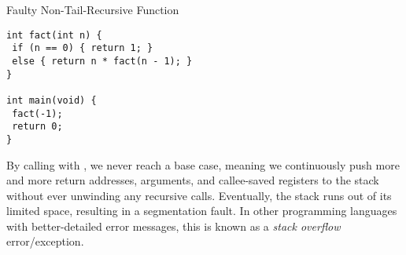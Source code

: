 \begin{cl}[main.c]{Faulty Non-Tail-Recursive Function}
\begin{lstlisting}[language=MyC]
int fact(int n) {
 if (n == 0) { return 1; }
 else { return n * fact(n - 1); }
}

int main(void) {
 fact(-1);
 return 0;
}
\end{lstlisting}
\end{cl}

By calling  with , we never reach a base case, meaning we continuously push more and more return addresses, arguments, and callee-saved registers to the stack without ever unwinding any recursive calls. Eventually, the stack runs out of its limited space, resulting in a segmentation fault. In other programming languages with better-detailed error messages, this is known as a \textit{stack overflow} error/exception.
